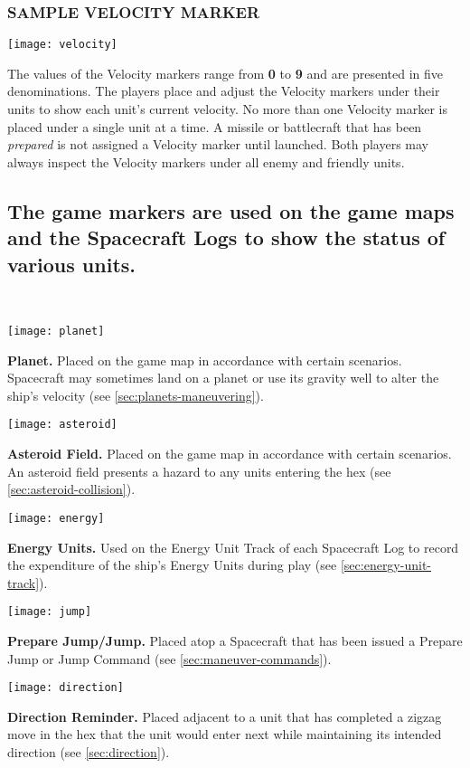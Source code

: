 \subsubsection*{SAMPLE VELOCITY MARKER}

\indent\texttt{[image: velocity]}
\parbox{0.5\textwidth}{The values of the Velocity markers range from
  \textbf{0} to \textbf{9} and are presented in five denominations.
  The players place and adjust the Velocity markers under their units
  to show each unit's current velocity. No more than one Velocity
  marker is placed under a single unit at a time. A missile or
  battlecraft that has been \emph{prepared} is not assigned a Velocity
  marker until launched. Both players may always inspect the Velocity
  markers under all enemy and friendly units.}



\subsection[Game Markers]{The game markers are used on the game maps
  and the Spacecraft Logs to show the status of various  
  units.}
\label{sec:game-markers}

\indent ~

\texttt{[image: planet]}
\parbox{0.5\textwidth}{\textbf{Planet.} Placed on the game map in
  accordance with certain 
  scenarios.  Spacecraft may sometimes land on a planet or use its
  gravity well to alter the ship's velocity (see
  \ref{sec:planets-maneuvering}).}

\texttt{[image: asteroid]}
\parbox{0.5\textwidth}{\textbf{Asteroid Field.} Placed on the game
  map in accordance with certain scenarios.  An asteroid field
  presents a hazard to any units entering the hex (see
  \ref{sec:asteroid-collision}).}

\bigskip

\texttt{[image: energy]}
\parbox{0.5\textwidth}{\textbf{Energy Units.} Used on the Energy Unit
  Track of each Spacecraft Log to record the expenditure of the ship's
  Energy Units during play (see \ref{sec:energy-unit-track}).}

\texttt{[image: jump]}
\parbox{0.5\textwidth}{\textbf{Prepare Jump/Jump.} Placed atop a
  Spacecraft that has been issued a Prepare Jump or Jump Command
  (see \ref{sec:maneuver-commands}).}


\texttt{[image: direction]}
\parbox{0.5\textwidth}{\textbf{Direction Reminder.} Placed adjacent to
  a unit that has completed a zigzag move in the hex that the unit
  would enter next while maintaining its intended direction (see
  \ref{sec:direction}).}

